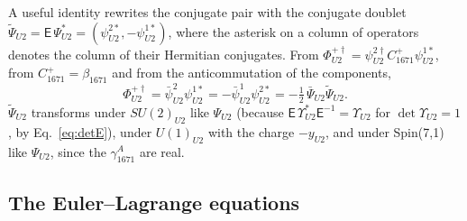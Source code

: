 A useful identity rewrites the conjugate pair with the conjugate doublet
$\tilde\Psi_{U2}=\mathsf E\,\Psi^*_{U2}=(\psi^{2*}_{U2},-\psi^{1*}_{U2})$, where the asterisk on a
column of operators denotes the column of their Hermitian conjugates. From
$\Phi^{+\dagger}_{U2}=\psi^{2\dagger}_{U2}C^+_{1671}\psi^{1*}_{U2}$, from $C^+_{1671}=\beta_{1671}$ and from
the anticommutation of the components,
\begin{equation}
\Phi^{+\dagger}_{U2}=\bar\psi^2_{U2}\psi^{1*}_{U2}=-\bar\psi^1_{U2}\psi^{2*}_{U2}
=-\tfrac12\,\bar\Psi_{U2}\tilde\Psi_{U2}.
\label{eq:phidag}
\end{equation}
$\tilde\Psi_{U2}$ transforms under $SU(2)_{U2}$ like $\Psi_{U2}$ (because
$\mathsf E\,\Upsilon^*_{U2}\mathsf E^{-1}=\Upsilon_{U2}$ for $\det\Upsilon_{U2}=1$, by
Eq.~\eqref{eq:detE}), under $U(1)_{U2}$ with the charge $-y_{U2}$, and under Spin(7,1) like
$\Psi_{U2}$, since the $\gamma^A_{1671}$ are real.

\subsection{The Euler--Lagrange equations}

